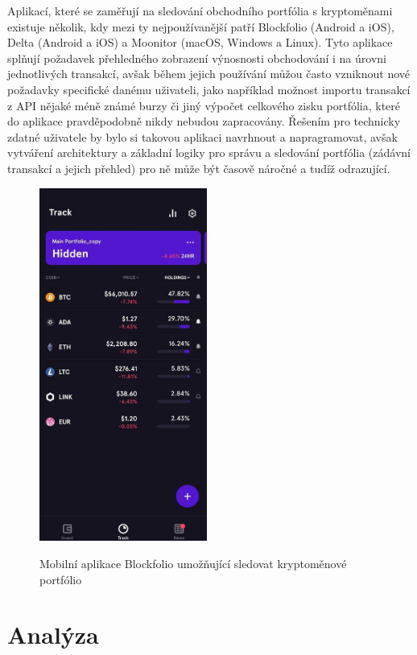 \documentclass[12pt, a4paper]{article}
\begin{document}
    Aplikací, které se zaměřují na sledování obchodního portfólia s kryptoměnami existuje několik, kdy mezi ty nejpoužívanější patří Blockfolio\cite{blockfolio2021} (Android a iOS), Delta\cite{delta2021} (Android a iOS) a Moonitor\cite{moonitor2021} (macOS, Windows a Linux). Tyto aplikace splňují požadavek přehledného zobrazení výnosnosti obchodování i na úrovni jednotlivých transakcí, avšak během jejich používání můžou často vzniknout nové požadavky specifické danému uživateli, jako například možnost importu transakcí z API nějaké méně známé burzy či jiný výpočet celkového zisku portfólia, které do aplikace pravděpodobně nikdy nebudou zapracovány. Řešením pro technicky zdatné uživatele by bylo si takovou aplikaci navrhnout a napragramovat, avšak vytváření architektury a základní logiky pro správu a sledování portfólia (zádávní transakcí a jejich přehled) pro ně může být časově náročné a tudíž odrazující.

    \begin{figure}[!ht]
        \centering
        {\includegraphics[width=5.5cm]{img/blockfolio.png}}
        \caption{Mobilní aplikace Blockfolio umožňující sledovat kryptoměnové portfólio}
        \label{fig:simple-vrp-czech}
    \end{figure}


    \section{Analýza}
    
\end{document}
